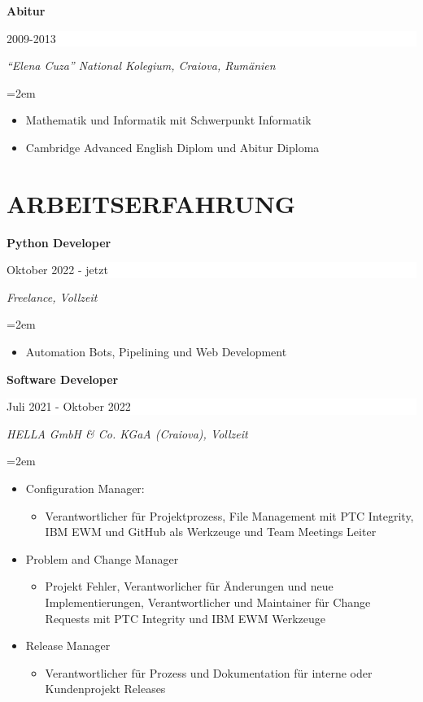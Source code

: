 \documentclass[paper=a4,fontsize=10.9pt]{scrartcl} %
\newcommand{\sepspace}{\vspace*{0.5em}}		%
\newcommand{\NewPart}[1]{\section*{\uppercase{#1}}}
\newcommand{\EducationEntry}[4]{
		\noindent \textbf{#1} \hfill      %
		\colorbox{White}{%
			\parbox{16em}{%
			\hfill\color{Black}#2}} \par  %
		\noindent \textit{#3} \par        %
		\noindent\hangindent=2em\hangafter=0 \small #4 %
		\normalsize \par}
\begin{document}

\EducationEntry{\color[HTML]{6a040f}Abitur}{2009-2013}{“Elena Cuza” National Kolegium, Craiova, Rumänien}{
\begin{itemize}
	\item{Mathematik und Informatik mit Schwerpunkt Informatik}
	\item{Cambridge Advanced English Diplom und Abitur Diploma}
\end{itemize}}


\NewPart{Arbeitserfahrung}{}

\EducationEntry{\color[HTML]{6a040f}Python Developer}{Oktober 2022 - jetzt}{Freelance, Vollzeit}{
\begin{itemize}
	\item{Automation Bots, Pipelining und Web Development}
\end{itemize}}

\EducationEntry{\color[HTML]{6a040f}Software Developer}{Juli 2021 - Oktober 2022}{HELLA GmbH \& Co. KGaA (Craiova), Vollzeit}{
\begin{itemize}
		\item{Configuration Manager:} 
		\begin{itemize}
			\item{Verantwortlicher für Projektprozess, File Management mit PTC Integrity, IBM EWM und GitHub als Werkzeuge und Team Meetings Leiter}
		\end{itemize}
		\item{Problem and Change Manager}
		\begin{itemize}
			\item{Projekt Fehler, Verantworlicher für Änderungen und neue Implementierungen, Verantwortlicher und Maintainer für Change Requests mit PTC Integrity und IBM EWM Werkzeuge}
		\end{itemize}
		\item{Release Manager}
		\begin{itemize}
			\item{Verantwortlicher für Prozess und Dokumentation für interne oder Kundenprojekt Releases}
		\end{itemize}
\end{itemize}}
\sepspace
\end{document}
